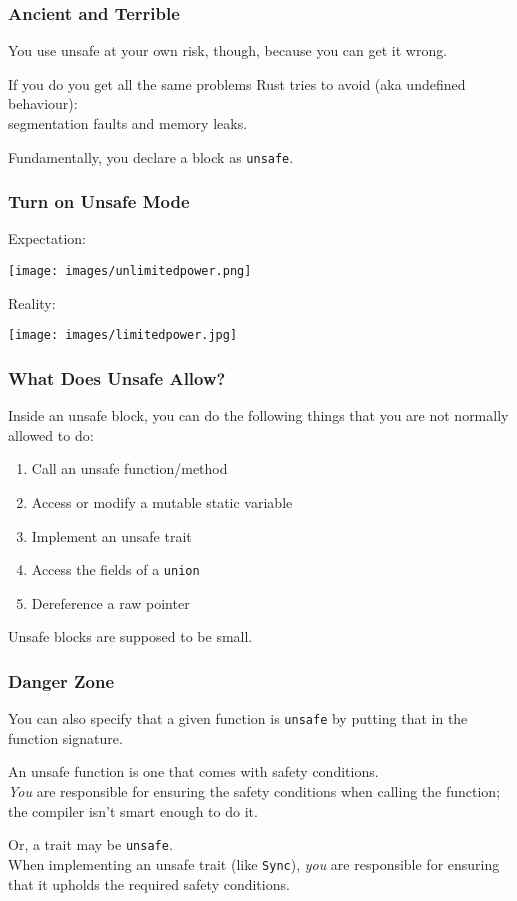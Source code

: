 \begin{frame}
\frametitle{Ancient and Terrible}

You use unsafe at your own risk, though, because you can get it wrong.

If you do you get all the same problems Rust tries to avoid (aka undefined behaviour):\\ 
\qquad segmentation faults and memory leaks.

Fundamentally, you declare a block as \texttt{unsafe}.

\end{frame}


\begin{frame}
\frametitle{Turn on Unsafe Mode}

Expectation:
\begin{center}
	\texttt{[image: images/unlimitedpower.png]}
\end{center}

Reality:
\begin{center}
	\texttt{[image: images/limitedpower.jpg]}
\end{center}

\end{frame}



\begin{frame}
\frametitle{What Does Unsafe Allow?}

Inside an unsafe block, you can do the following things that you are not normally allowed to do:

\begin{enumerate}
	\item Call an unsafe function/method
	\item Access or modify a mutable static variable
	\item Implement an unsafe trait
	\item Access the fields of a \texttt{union}
	\item Dereference a raw pointer
\end{enumerate}

Unsafe blocks are supposed to be small. 

\end{frame}


\begin{frame}[fragile]
\frametitle{Danger Zone}

You can also specify that a given function is \texttt{unsafe} by putting that in the function signature.

An unsafe function is one that comes with safety conditions.\\
\emph{You} are responsible for ensuring the safety conditions when calling the function; 
the compiler isn't smart enough to do it.

Or, a trait may be \texttt{unsafe}.\\
When implementing an unsafe trait (like \texttt{Sync}), \emph{you} are responsible for ensuring
that it upholds the required safety conditions.

\end{frame}

